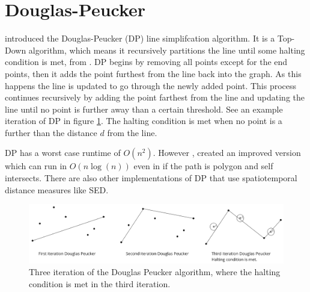 \section{Douglas-Peucker}
\cite{dp} introduced the Douglas-Peucker (DP) line simplifcation algorithm. It is a Top-Down algorithm, which means it recursively partitions the line until some halting condition is met, from \cite{Sun2016}. DP begins by removing all points except for the end points, then it adds the point furthest from the line back into the graph. As this happens the line is updated to go through the newly added point. This process continues recursively by adding the point farthest from the line and updating the line until no point is further away than a certain threshold. See an example iteration of DP in figure \ref{dp}. The halting condition is met when no point is a further than the distance $d$ from the line.

DP has a worst case runtime of $O(n^{2})$. However \cite{gudmundsson2009compressing}, created an improved version which can run in $O(n\log(n))$ even in if the path is polygon and self intersects. There are also other implementations of DP that use spatiotemporal distance measures like SED.
\begin{figure}[h]
    \includegraphics[width=1.0\linewidth]{./figures/dp.png}
    \caption{Three iteration of the Douglas Peucker algorithm, where the halting condition is met in the third iteration.}
    \label{dp}
\end{figure}

